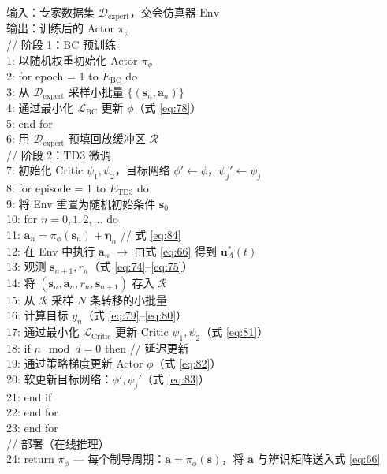 \begin{algorithm}[H]
\caption{面向制导参数优化的 BC-TD3 离线训练}
\label{alg:bctd3}
{\footnotesize
\raggedright
输入：专家数据集 \(\mathcal{D}_{\text{expert}}\)，交会仿真器 \(\text{Env}\)\\
输出：训练后的 Actor \(\pi_\phi\)\\
// 阶段 1：BC 预训练\\
1: 以随机权重初始化 Actor \(\pi_\phi\)\\
2: for epoch = 1 to \(E_{\text{BC}}\) do\\
3:   从 \(\mathcal{D}_{\text{expert}}\) 采样小批量 \(\{(\boldsymbol{s}_n, \boldsymbol{a}_n)\}\)\\
4:   通过最小化 \(\mathcal{L}_{\text{BC}}\) 更新 \(\phi\)（式 \ref{eq:78}）\\
5: end for\\
6: 用 \(\mathcal{D}_{\text{expert}}\) 预填回放缓冲区 \(\mathcal{R}\)\\
// 阶段 2：TD3 微调\\
7: 初始化 Critic \(\psi_1, \psi_2\)，目标网络 \(\phi' \leftarrow \phi\)，\(\psi_j' \leftarrow \psi_j\)\\
8: for episode = 1 to \(E_{\text{TD3}}\) do\\
9:   将 Env 重置为随机初始条件 \(\boldsymbol{s}_0\)\\
10:  for \(n = 0, 1, 2, \ldots\) do\\
11:    \(\boldsymbol{a}_n = \pi_\phi(\boldsymbol{s}_n) + \boldsymbol{\eta}_n\)                    // 式 \ref{eq:84}\\
12:    在 Env 中执行 \(\boldsymbol{a}_n\) \(\to\) 由式 \eqref{eq:66} 得到 \(\boldsymbol{u}_A^*(t)\)\\
13:    观测 \(\boldsymbol{s}_{n+1}, r_n\)（式 \ref{eq:74}--\ref{eq:75}）\\
14:    将 \((\boldsymbol{s}_n, \boldsymbol{a}_n, r_n, \boldsymbol{s}_{n+1})\) 存入 \(\mathcal{R}\)\\
15:    从 \(\mathcal{R}\) 采样 \(N\) 条转移的小批量\\
16:    计算目标 \(y_n\)（式 \ref{eq:79}--\ref{eq:80}）\\
17:    通过最小化 \(\mathcal{L}_{\text{Critic}}\) 更新 Critic \(\psi_1, \psi_2\)（式 \ref{eq:81}）\\
18:    if \(n \mod d = 0\) then                                           // 延迟更新\\
19:      通过策略梯度更新 Actor \(\phi\)（式 \ref{eq:82}）\\
20:      软更新目标网络：\(\phi', \psi_j'\)（式 \ref{eq:83}）\\
21:    end if\\
22:  end for\\
23: end for\\
// 部署（在线推理）\\
24: return \(\pi_\phi\) — 每个制导周期：\(\boldsymbol{a} = \pi_\phi(\boldsymbol{s})\)，将 \(\boldsymbol{a}\) 与辨识矩阵送入式 \eqref{eq:66}
}
\end{algorithm}
